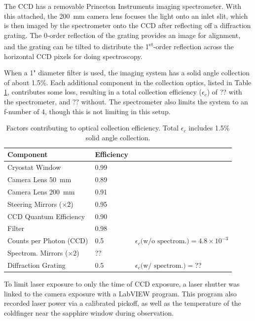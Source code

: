 The CCD has a removable Princeton Instruments imaging spectrometer.  With this attached, the 200~mm camera lens focuses the light onto an inlet slit, which is then imaged by the spectrometer onto the CCD after reflecting off a diffraction grating.  The 0-order reflection of the grating provides an image for alignment, and the grating can be tilted to distribute the 1\textsuperscript{st}-order reflection across the horizontal CCD pixels for doing spectroscopy.

When a 1" diameter filter is used, the imaging system has a solid angle collection of about 1.5\%.  Each additional component in the collection optics, listed in Table \ref{table:colleff}, contributes some loss, resulting in a total collection efficiency ($\epsilon_{c}$) of {\color{red}??} with the spectrometer, and {\color{red}??} without.  The spectrometer also limits the system to an f-number of 4, though this is not limiting in this setup.

\begin{table} [!htbp]
\caption{Factors contributing to optical collection efficiency.  Total $\epsilon_{c}$ includes 1.5\% solid angle collection.}
\label{table:colleff}
\begin{tabular}{l l l}
Component & Efficiency & \\
\hline
Cryostat Window & 0.99 & \\
Camera Lens 50~mm & 0.89 & \\
Camera Lens 200~mm & 0.91 & \\
Steering Mirrors ($\times 2$) & 0.95 & \\
CCD Quantum Efficiency & 0.90 & \\
Filter & 0.98 & \\
Counts per Photon (CCD) & 0.5 & $\epsilon_{c}\text{(w/o spectrom.)} = 4.8 \times 10^{-3}$\\
\hline
Spectrom. Mirrors ($\times 2$) & {\color{red}??} & \\
Diffraction Grating & 0.5 & $\epsilon_{c}\text{(w/ spectrom.)} = ${\color{red}??}\\
\end{tabular}
\end{table}

To limit laser exposure to only the time of CCD exposure, a laser shutter was linked to the camera exposure with a LabVIEW program.  This program also recorded laser power via a calibrated pickoff, as well as the temperature of the coldfinger near the sapphire window during observation.

